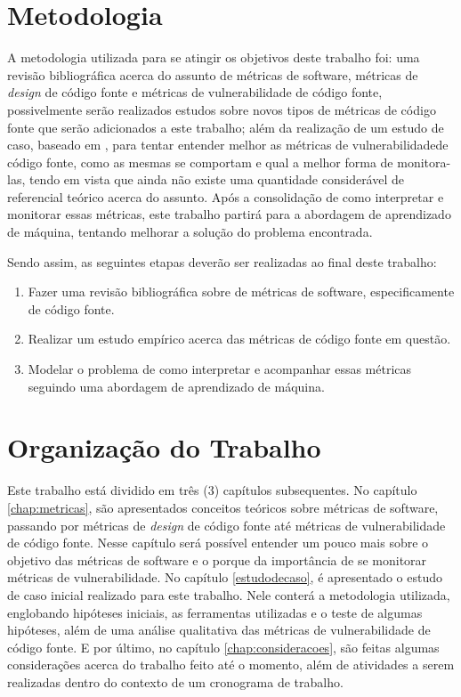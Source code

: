 \section{Metodologia}

A metodologia utilizada para se atingir os objetivos deste trabalho foi: uma
revisão bibliográfica acerca do assunto de métricas de software, métricas de
\textit{design} de código fonte e métricas de vulnerabilidade de código fonte,
possivelmente serão realizados estudos sobre novos tipos de métricas de código
fonte que serão adicionados a este trabalho; além da realização de um estudo de 
caso, baseado em , para tentar entender 
melhor as métricas de vulnerabilidadede código fonte, como as mesmas se comportam 
e qual a melhor forma de monitora-las, tendo em vista que ainda não existe uma
quantidade considerável de referencial teórico acerca do assunto. Após a
consolidação de como interpretar e monitorar essas métricas, este trabalho
partirá para a abordagem de aprendizado de máquina, tentando melhorar a solução
do problema encontrada.

Sendo assim, as seguintes etapas deverão ser realizadas ao final deste trabalho:

\begin{enumerate}
  \item Fazer uma revisão bibliográfica sobre de métricas de software,
    especificamente de código fonte.
  \item Realizar um estudo empírico acerca das métricas de código fonte em
    questão.
  \item Modelar o problema de como interpretar e acompanhar essas métricas
    seguindo uma abordagem de aprendizado de máquina.
\end{enumerate}


\section{Organização do Trabalho}

Este trabalho está dividido em três (3) capítulos subsequentes. No capítulo
\ref{chap:metricas}, são apresentados conceitos teóricos sobre métricas de
software, passando por métricas de \textit{design} de código fonte até métricas de 
vulnerabilidade de código fonte. Nesse capítulo será possível entender um pouco mais 
sobre o objetivo das métricas de software e o porque da importância de se monitorar
métricas de vulnerabilidade. No capítulo \ref{estudodecaso}, é apresentado o
estudo de caso inicial realizado para este trabalho. Nele conterá a metodologia
utilizada, englobando hipóteses iniciais, as ferramentas utilizadas e o teste de
algumas hipóteses, além de uma análise qualitativa das métricas de
vulnerabilidade de código fonte. E por último, no capítulo
\ref{chap:consideracoes}, são feitas algumas considerações acerca do trabalho
feito até o momento, além de atividades a serem realizadas dentro do contexto de
um cronograma de trabalho.

